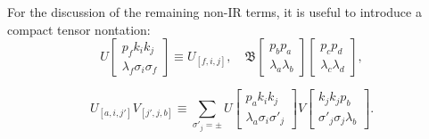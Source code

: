 For the discussion of the remaining non-IR terms, it is useful to introduce a compact tensor nontation:
\begin{equation}
U\left[ \begin{array}{c}
p_fk_ik_j\\\lambda_f\sigma_i\sigma_f
\end{array} \right]\equiv U_{[f,i,j]},\quad \mathfrak{B}\left[\begin{array}{c}
p_bp_a\\\lambda_a\lambda_b
\end{array}\right]\left[\begin{array}{c}
p_cp_d\\\lambda_c\lambda_d
\end{array}\right],
\end{equation}


\begin{equation}
U_{[a,i,j']}V_{[j',j,b]}\equiv\sum_{\sigma'_j=\pm}U\left[\begin{array}{c}
p_ak_ik_j\\\lambda_a\sigma_i\sigma'_j
\end{array}\right]V\left[\begin{array}{c}
k_jk_jp_b\\\sigma'_j\sigma_j\lambda_b
\end{array}\right].
\end{equation}

